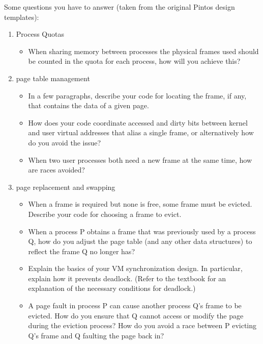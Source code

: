Some questions you have to answer (taken from the original Pintos design templates):
\begin{enumerate}
    \item Process Quotas
        \begin{itemize}
            \item When sharing memory between processes the physical frames used should be counted in the quota for each process, how will you achieve this?
        \end{itemize}

    \item page table management
        \begin{itemize}
            \item In a few paragraphs, describe your code for locating the frame, if any, that contains the data of a given page.
            
            \item How does your code coordinate accessed and dirty bits between kernel and user virtual addresses that alias a single frame, or alternatively how do you avoid the issue?
            
            \item When two user processes both need a new frame at the same time, how are races avoided?
        \end{itemize}
    
    \item page replacement and swapping
        \begin{itemize}
            \item When a frame is required but none is free, some frame must be evicted.  Describe your code for choosing a frame to evict.
            
            \item When a process P obtains a frame that was previously used by a process Q, how do you adjust the page table (and any other data structures) to reflect the frame Q no longer has?
            
            \item Explain the basics of your VM synchronization design. In particular, explain how it prevents deadlock. (Refer to the textbook for an explanation of the necessary conditions for deadlock.)
            
            \item A page fault in process P can cause another process Q's frame to be evicted. How do you ensure that Q cannot access or modify the page during the eviction process?  How do you avoid a race between P evicting Q's frame and Q faulting the page back in?
            

\end{itemize}
\end{enumerate}
